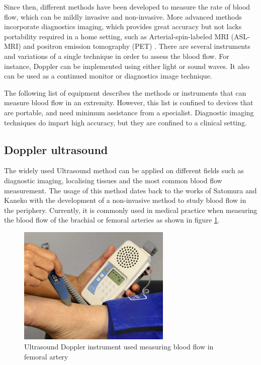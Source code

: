 Since then, different methods have been developed to measure the rate of blood flow, which can be mildly invasive and non-invasive. More advanced methods incorporate diagnostics imaging, which provides great accuracy but not lacks portability required in a home setting, such as Arterial-spin-labeled MRI (ASL-MRI) \cite{schmitt2003quantitative} and positron emission tomography (PET) \cite{baron1999mapping}. There are several instruments and variations of a single technique in order to assess the blood flow. For instance, Doppler can be implemented using either light or sound waves. It also can be used as a continued monitor or diagnostics image technique. 

The following list of equipment describes the methods or instruments that can measure blood flow in an extremity. However, this list is confined to devices that are portable, and need minimum assistance from a specialist. Diagnostic imaging techniques do impart high accuracy, but they are confined to a clinical setting.

\subsection{Doppler ultrasound}
\label{section literature UD}
The widely used Ultrasound method can be applied on different fields such as diagnostic imaging, localising tissues and the most common blood flow measurement. The usage of this method dates back to the works of Satomura and Kaneko \cite{satomura1959study} with the development of a non-invasive method to study blood flow in the periphery. Currently, it is commonly used in medical practice when measuring the blood flow of the brachial or femoral arteries \cite{casey2008measuring} as shown in figure \ref{fig:UD Instrument}. 

\begin{figure}[!htpb]
	\centering
	\includegraphics[width=0.65\textwidth,keepaspectratio]{ultrasound_doppler}    
	\caption[Ultrasound Doppler instrument]{Ultrasound Doppler instrument used measuring blood flow in femoral artery \cite{ultrasoundinstrument}}
	\label{fig:UD Instrument}
\end{figure}

